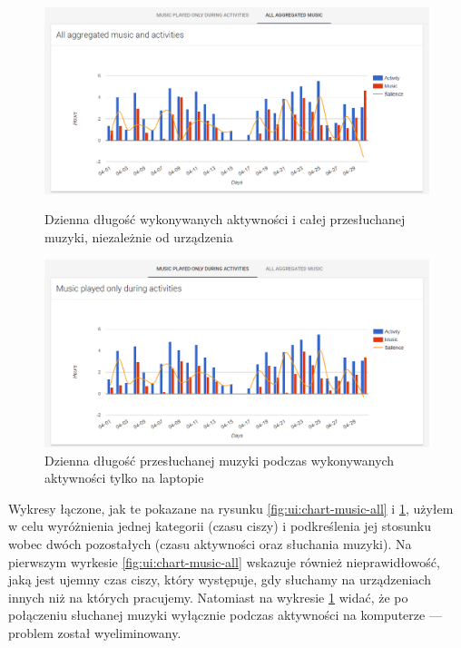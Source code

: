 \documentclass[openright]{xmgr}
\begin{document}
    \begin{figure}
        \includegraphics[width=\linewidth]{fig/ui/chart-music-all.png}
        \caption{Dzienna długość wykonywanych aktywności i całej przesłuchanej muzyki, niezależnie od urządzenia}
        \label{fig:ui:chart-music-all}

        \includegraphics[width=\linewidth]{fig/ui/chart-music-only-during-activities.png}
        \caption{Dzienna długość przesłuchanej muzyki podczas wykonywanych aktywności tylko na laptopie}
        \label{fig:ui:chart-music-only-during-activities}
    \end{figure}

    Wykresy łączone, jak te pokazane na rysunku \ref{fig:ui:chart-music-all} i \ref{fig:ui:chart-music-only-during-activities},
    użyłem w celu wyróżnienia jednej kategorii (czasu ciszy) i podkreślenia jej stosunku wobec dwóch pozostałych (czasu aktywności oraz słuchania muzyki).
    Na pierwszym wyrkesie \ref{fig:ui:chart-music-all} wskazuje również nieprawidłowość, jaką jest ujemny czas ciszy,
    który występuje, gdy słuchamy na urządzeniach innych niż na których pracujemy.
    Natomiast na wykresie \ref{fig:ui:chart-music-only-during-activities} widać,
    że po połączeniu słuchanej muzyki wyłącznie podczas aktywności na komputerze --- problem został wyeliminowany.
\end{document}
